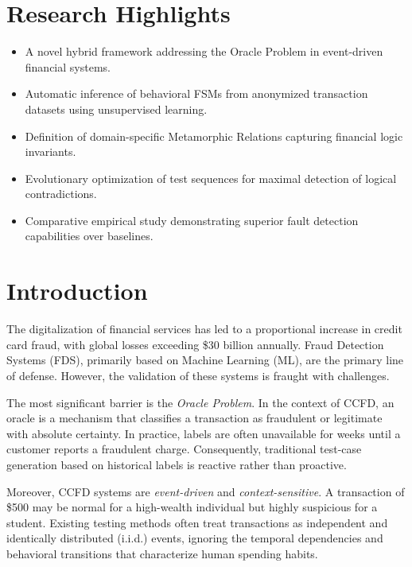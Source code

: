 \documentclass[review]{elsarticle}
\begin{document}
\section*{Research Highlights}
\begin{itemize}
    \item A novel hybrid framework addressing the Oracle Problem in event-driven financial systems.
    \item Automatic inference of behavioral FSMs from anonymized transaction datasets using unsupervised learning.
    \item Definition of domain-specific Metamorphic Relations capturing financial logic invariants.
    \item Evolutionary optimization of test sequences for maximal detection of logical contradictions.
    \item Comparative empirical study demonstrating superior fault detection capabilities over baselines.
\end{itemize}

\section{Introduction}
\label{sec:intro}
The digitalization of financial services has led to a proportional increase in credit card fraud, with global losses exceeding \$30 billion annually. Fraud Detection Systems (FDS), primarily based on Machine Learning (ML), are the primary line of defense. However, the validation of these systems is fraught with challenges.

The most significant barrier is the \textit{Oracle Problem}. In the context of CCFD, an oracle is a mechanism that classifies a transaction as fraudulent or legitimate with absolute certainty. In practice, labels are often unavailable for weeks until a customer reports a fraudulent charge. Consequently, traditional test-case generation based on historical labels is reactive rather than proactive.

Moreover, CCFD systems are \textit{event-driven} and \textit{context-sensitive}. A transaction of \$500 may be normal for a high-wealth individual but highly suspicious for a student. Existing testing methods often treat transactions as independent and identically distributed (i.i.d.) events, ignoring the temporal dependencies and behavioral transitions that characterize human spending habits.
\end{document}
